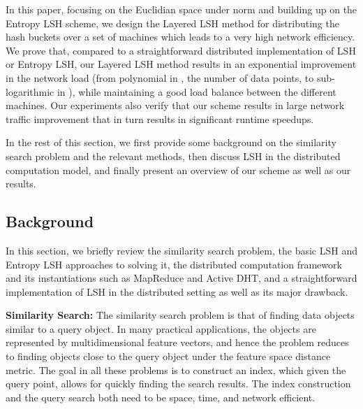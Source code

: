 \documentclass{acm_proc_article-sp}
\numberwithin{equation}{section}
\numberwithin{figure}{section}
\begin{document}
In this paper, focusing on the Euclidian space under  norm and building up on the Entropy LSH scheme, we design the Layered LSH method for distributing the hash buckets over a set of machines which leads to a very high network efficiency. We prove that, compared to a straightforward distributed implementation of LSH or Entropy LSH, our Layered LSH method results in an exponential improvement in the network load (from polynomial in , the number of data points, to sub-logarithmic in ), while maintaining a good load balance between the different machines. Our experiments also verify that our scheme results in large network traffic improvement that in turn results in significant runtime speedups. 

In the rest of this section, we first provide some background on the similarity search problem and the relevant methods, then discuss LSH in the distributed computation model, and finally present an overview of our scheme as well as our results.


\subsection{Background}
\label{sec:bckgrnd}

In this section, we briefly review the similarity search problem, the basic LSH and Entropy LSH approaches to solving it, the distributed computation framework and its instantiations such as MapReduce and Active DHT, and a straightforward implementation of LSH in the distributed setting as well as its major drawback.

\noindent \textbf{Similarity Search:} The similarity search problem is that of finding data objects similar to a query object. In many practical applications, the objects are represented by multidimensional feature vectors, and hence the problem reduces to finding objects close to the query object under the feature space distance metric. The goal in all these problems is to construct an index, which given the query point, allows for quickly finding the search results. The index construction and the query search both need to be space, time, and network efficient.
\end{document}
